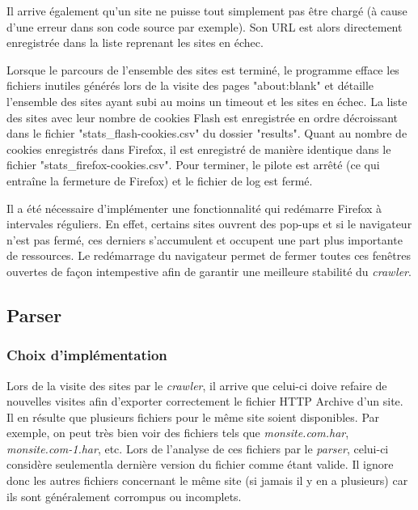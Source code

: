 Il arrive également qu'un site ne puisse tout simplement pas être chargé (à cause d'une erreur dans son code source par exemple). Son URL est alors directement enregistrée dans la liste reprenant les sites en échec.
\newline

Lorsque le parcours de l'ensemble des sites est terminé, le programme efface les fichiers inutiles générés lors de la visite des pages "about:blank" et détaille l'ensemble des sites ayant subi au moins un timeout et les sites en échec. La liste des sites avec leur nombre de cookies Flash est enregistrée en ordre décroissant dans le fichier "stats\_flash-cookies.csv" du dossier "results". Quant au nombre de cookies enregistrés dans Firefox, il est enregistré de manière identique dans le fichier "stats\_firefox-cookies.csv". Pour terminer, le pilote est arrêté (ce qui entraîne la fermeture de Firefox) et le fichier de log est fermé.
\newline

Il a été nécessaire d'implémenter une fonctionnalité qui redémarre Firefox à intervales réguliers. En effet, certains sites ouvrent des pop-ups et si le navigateur n'est pas fermé, ces derniers s'accumulent et occupent une part plus importante de ressources. Le redémarrage du navigateur permet de fermer toutes ces fenêtres ouvertes de façon intempestive afin de garantir une meilleure stabilité du \textit{crawler}.

\subsection{Parser}
\label{parser}
\subsubsection{Choix d'implémentation}
Lors de la visite des sites par le \textit{crawler}, il arrive que celui-ci doive refaire de nouvelles visites afin d'exporter correctement le fichier HTTP Archive d'un site. Il en résulte que plusieurs fichiers pour le même site soient disponibles. Par exemple, on peut très bien voir des fichiers tels que \textit{monsite.com.har}, \textit{monsite.com-1.har}, etc. Lors de l'analyse de ces fichiers par le \textit{parser}, celui-ci considère seulementla dernière version du fichier comme étant valide. Il ignore donc les autres fichiers concernant le même site (si jamais il y en a plusieurs) car ils sont généralement corrompus ou incomplets.
\newline

